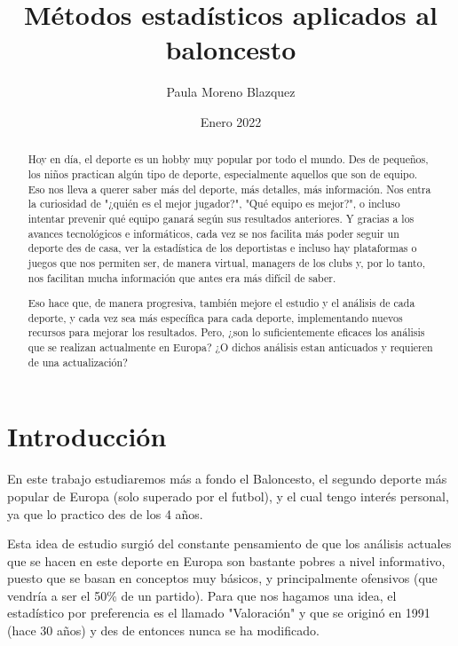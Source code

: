 \documentclass[paper=a4, fontsize=9pt]{article}
\title{Métodos estadísticos aplicados al baloncesto}
\author{Paula Moreno Blazquez}
\date{Enero 2022}
\begin{document}


\maketitle

\clearpage

\begin{abstract}

Hoy en día, el deporte es un hobby muy popular por todo el mundo. Des de pequeños, los niños practican algún tipo de deporte, especialmente aquellos que son de equipo. Eso nos lleva a querer saber más del deporte, más detalles, más información. Nos entra la curiosidad de "¿quién es el mejor jugador?", "Qué equipo es mejor?", o incluso intentar prevenir qué equipo ganará según sus resultados anteriores. Y gracias a los avances tecnológicos e informáticos, cada vez se nos facilita más poder seguir un deporte des de casa, ver la estadística de los deportistas e incluso hay plataformas o juegos que nos permiten ser, de manera virtual, managers de los clubs y, por lo tanto, nos facilitan mucha información que antes era más difícil de saber.

Eso hace que, de manera progresiva, también mejore el estudio y el análisis de cada deporte, y cada vez sea más específica para cada deporte, implementando nuevos recursos para mejorar los resultados. Pero, ¿son lo suficientemente eficaces los análisis que se realizan actualmente en Europa? ¿O dichos análisis estan anticuados y requieren de una actualización?

\end{abstract}

\pagebreak            
\newpage              

\tableofcontents

\clearpage



\section{Introducción}

En este trabajo estudiaremos más a fondo el Baloncesto, el segundo deporte más popular de Europa (solo superado por el futbol), y el cual tengo interés personal, ya que lo practico des de los 4 años.

Esta idea de estudio surgió del constante pensamiento de que los análisis actuales que se hacen en este deporte en Europa son bastante pobres a nivel informativo, puesto que se basan en conceptos muy básicos, y principalmente ofensivos (que vendría a ser el 50\% de un partido). Para que nos hagamos una idea, el estadístico por preferencia es el llamado "Valoración" y que se originó en 1991 (hace 30 años) y des de entonces nunca se ha modificado.
\end{document}
